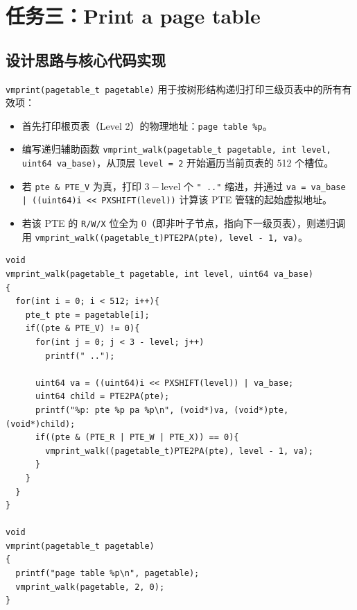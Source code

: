 \documentclass[12pt, a4paper]{ctexart}
\begin{document}
\section{任务三：Print a page table}

\subsection{设计思路与核心代码实现}
\texttt{vmprint(pagetable\_t pagetable)} 用于按树形结构递归打印三级页表中的所有有效项：
\begin{itemize}
    \item 首先打印根页表（Level 2）的物理地址：\texttt{page table \%p}。
    \item 编写递归辅助函数 \texttt{vmprint\_walk(pagetable\_t pagetable, int level, uint64 va\_base)}，从顶层 \texttt{level = 2} 开始遍历当前页表的 512 个槽位。
    \item 若 \texttt{pte \& PTE\_V} 为真，打印 $3 - \text{level}$ 个 \texttt{" .."} 缩进，并通过 \texttt{va = va\_base | ((uint64)i << PXSHIFT(level))} 计算该 PTE 管辖的起始虚拟地址。
    \item 若该 PTE 的 \texttt{R/W/X} 位全为 0（即非叶子节点，指向下一级页表），则递归调用 \texttt{vmprint\_walk((pagetable\_t)PTE2PA(pte), level - 1, va)}。
\end{itemize}

\begin{lstlisting}[caption={\texttt{kernel/vm.c} 中 \texttt{vmprint} 与 \texttt{vmprint\_walk} 的实现}]
void
vmprint_walk(pagetable_t pagetable, int level, uint64 va_base)
{
  for(int i = 0; i < 512; i++){
    pte_t pte = pagetable[i];
    if((pte & PTE_V) != 0){
      for(int j = 0; j < 3 - level; j++)
        printf(" ..");

      uint64 va = ((uint64)i << PXSHIFT(level)) | va_base;
      uint64 child = PTE2PA(pte);
      printf("%p: pte %p pa %p\n", (void*)va, (void*)pte, (void*)child);
      if((pte & (PTE_R | PTE_W | PTE_X)) == 0){
        vmprint_walk((pagetable_t)PTE2PA(pte), level - 1, va);
      }
    }
  }
}

void
vmprint(pagetable_t pagetable)
{
  printf("page table %p\n", pagetable);
  vmprint_walk(pagetable, 2, 0);
}
\end{lstlisting}
\end{document}
